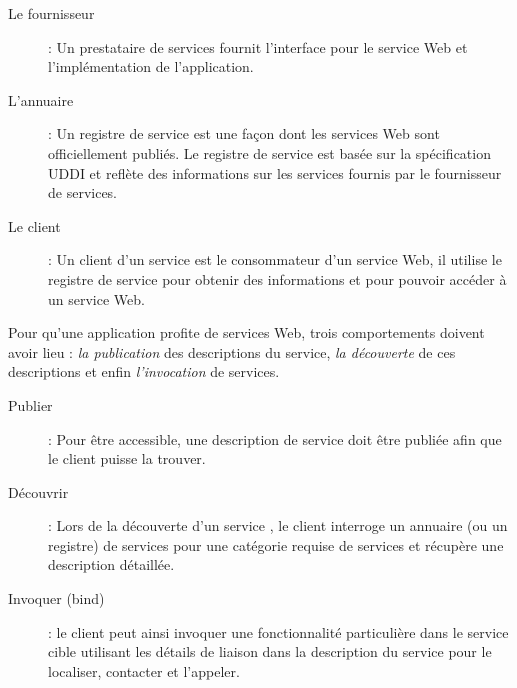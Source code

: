   \renewcommand{\descriptionlabel}[1]{\hspace{0.5cm}\textbullet~\textsf{#1}}
  \begin{description}
  \item[Le fournisseur]: Un prestataire de services fournit
    l'interface pour le service Web et l'implémentation de
    l'application.

  \item[L'annuaire]: Un registre de service est une façon dont les
    services Web sont officiellement publiés. Le registre de service
    est basée sur la spécification \textsc{UDDI} et reflète des
    informations sur les services fournis par le fournisseur de
    services.

  \item[Le client]: Un client d'un service est le consommateur d'un
    service Web, il utilise le registre de service pour obtenir des
    informations et pour pouvoir accéder à un service Web.
  \end{description}

  Pour qu'une application profite de services Web, trois comportements
  doivent avoir lieu : \textit{la publication} des descriptions du
  service, \textit{la découverte} de ces descriptions et enfin
  \textit{l'invocation} de services.

  \renewcommand{\descriptionlabel}[1]{\hspace{0.5cm}\textbullet~\textsf{#1}}
  \begin{description}
  \item[Publier]: Pour être accessible, une description de service
    doit être publiée afin que le client puisse la trouver.

  \item[Découvrir]: Lors de la découverte d'un service , le client
    interroge un annuaire (ou un registre) de services pour une
    catégorie requise de services et récupère une description
    détaillée.

  \item[Invoquer (bind)]: le client peut ainsi invoquer une
    fonctionnalité particulière dans le service cible utilisant les
    détails de liaison dans la description du service pour le
    localiser, contacter et l'appeler.
  \end{description}
  \enddescription


